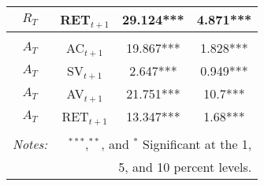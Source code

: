 \begin{table}[!htbp]
\begin{adjustbox}{center,max height=\totalheight}
\begin{tabular}{cccc}
				$R_{T}$ & RET$_{t+1}$ & 29.124*** & 4.871*** \\
				\hline\\[-1.8ex]
				$A_{T}$ & AC$_{t+1}$ & 19.867*** & 1.828*** \\
				$A_{T}$ & SV$_{t+1}$ & 2.647*** & 0.949*** \\
				$A_{T}$ & AV$_{t+1}$ & 21.751*** & 10.7*** \\
				$A_{T}$ & RET$_{t+1}$ & 13.347*** & 1.68*** \\
				\hline\\[-1.8ex] 
				\textit{Notes:} & \multicolumn{3}{r}{$^{***}$,$^{**}$, and $^{*}$ Significant at the 1,} \\ 
				& \multicolumn{3}{r}{ 5, and 10 percent levels.}
			\end{tabular}
		\end{adjustbox}
\end{table}